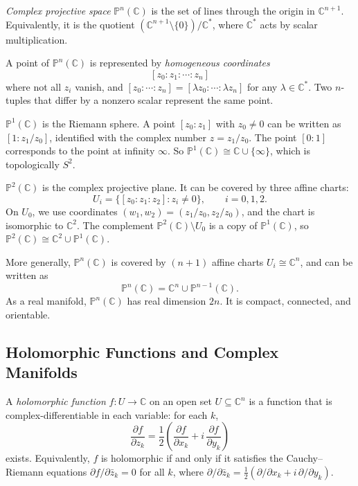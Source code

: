 \begin{definition}
\emph{Complex projective space} $\mathbb{P}^n(\mathbb{C})$ is the set of lines through the origin in $\mathbb{C}^{n+1}$. Equivalently, it is the quotient $(\mathbb{C}^{n+1} \setminus \{0\}) / \mathbb{C}^*$, where $\mathbb{C}^*$ acts by scalar multiplication.
\end{definition}

A point of $\mathbb{P}^n(\mathbb{C})$ is represented by \emph{homogeneous coordinates}
\[
[z_0 : z_1 : \cdots : z_n]
\]
where not all $z_i$ vanish, and $[z_0 : \cdots : z_n] = [\lambda z_0 : \cdots : \lambda z_n]$ for any $\lambda \in \mathbb{C}^*$. Two $n$-tuples that differ by a nonzero scalar represent the same point.

\begin{example}
$\mathbb{P}^1(\mathbb{C})$ is the Riemann sphere. A point $[z_0 : z_1]$ with $z_0 \neq 0$ can be written as $[1 : z_1/z_0]$, identified with the complex number $z = z_1/z_0$. The point $[0 : 1]$ corresponds to the point at infinity $\infty$. So $\mathbb{P}^1(\mathbb{C}) \cong \mathbb{C} \cup \{\infty\}$, which is topologically $S^2$.
\end{example}

\begin{example}
$\mathbb{P}^2(\mathbb{C})$ is the complex projective plane. It can be covered by three affine charts:
\[
U_i = \{[z_0 : z_1 : z_2] : z_i \neq 0\}, \qquad i = 0, 1, 2.
\]
On $U_0$, we use coordinates $(w_1, w_2) = (z_1/z_0, z_2/z_0)$, and the chart is isomorphic to $\mathbb{C}^2$. The complement $\mathbb{P}^2(\mathbb{C}) \setminus U_0$ is a copy of $\mathbb{P}^1(\mathbb{C})$, so $\mathbb{P}^2(\mathbb{C}) \cong \mathbb{C}^2 \cup \mathbb{P}^1(\mathbb{C})$.
\end{example}

More generally, $\mathbb{P}^n(\mathbb{C})$ is covered by $(n+1)$ affine charts $U_i \cong \mathbb{C}^n$, and can be written as
\[
\mathbb{P}^n(\mathbb{C}) = \mathbb{C}^n \cup \mathbb{P}^{n-1}(\mathbb{C}).
\]
As a real manifold, $\mathbb{P}^n(\mathbb{C})$ has real dimension $2n$. It is compact, connected, and orientable.

\subsection{Holomorphic Functions and Complex Manifolds}

A \emph{holomorphic function} $f: U \to \mathbb{C}$ on an open set $U \subseteq \mathbb{C}^n$ is a function that is complex-differentiable in each variable: for each $k$,
\[
\frac{\partial f}{\partial z_k} = \frac{1}{2}\left(\frac{\partial f}{\partial x_k} + i\, \frac{\partial f}{\partial y_k}\right)
\]
exists. Equivalently, $f$ is holomorphic if and only if it satisfies the Cauchy--Riemann equations $\partial f / \partial \bar{z}_k = 0$ for all $k$, where $\partial / \partial \bar{z}_k = \frac{1}{2}(\partial/\partial x_k + i\, \partial/\partial y_k)$.

